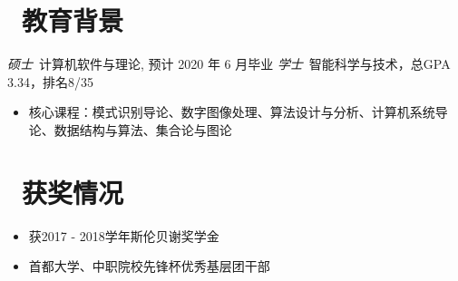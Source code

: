 \documentclass{resume}
\begin{document}

 
\section{\faGraduationCap\ 教育背景}
\textit{硕士}\ 计算机软件与理论, 预计 2020 年 6 月毕业
\textit{学士}\ 智能科学与技术，总GPA 3.34，排名8/35
\begin{itemize}[parsep=0.5ex]
	\item 核心课程：模式识别导论、数字图像处理、算法设计与分析、计算机系统导论、数据结构与算法、集合论与图论
\end{itemize}

\section{\faHeartO\ 获奖情况}

\begin{itemize}[parsep=0.5ex]
	\item 获2017 - 2018学年斯伦贝谢奖学金
\end{itemize}

\begin{itemize}[parsep=0.5ex]
	\item 首都大学、中职院校先锋杯优秀基层团干部
\end{itemize}
\end{document}
